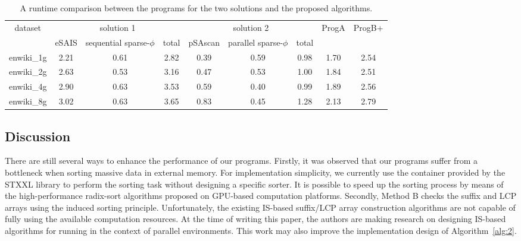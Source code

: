 \documentclass[10pt,journal,compsoc]{IEEEtran}
\begin{document}
\renewcommand\arraystretch{1.3}
\begin{table}[h]
	\caption{A runtime comparison between the programs for the two solutions and the proposed algorithms.}
	\label{tbl:3}
	\centering
	\begin{tabular}{|c|c|c|c|c|c|c|c|c|}
		\hline
		\multirow{2}{*}{dataset} & \multicolumn{3}{|c|}{solution 1} & \multicolumn{3}{c|}{solution 2} & \multirow{2}{*}{ProgA} & \multirow{2}{*}{ProgB+} \\\cline{2-7}
		 & eSAIS & sequential sparse-$\phi$ & total & pSAscan & parallel sparse-$\phi$ & total & & \\\hline
		enwiki\_1g & 2.21 & 0.61 & 2.82 & 0.39 & 0.59 & 0.98 & 1.70 & 2.54 \\\hline
		enwiki\_2g & 2.63 & 0.53 & 3.16 & 0.47 & 0.53 & 1.00 & 1.84 & 2.51 \\\hline
		enwiki\_4g & 2.90 & 0.63 & 3.53 & 0.59 & 0.40 & 0.99 & 1.89 & 2.56 \\\hline
		enwiki\_8g & 3.02 & 0.63 & 3.65 & 0.83 & 0.45 & 1.28 & 2.13 & 2.79 \\\hline
	\end{tabular}
\end{table}



\subsection{Discussion}

There are still several ways to enhance the performance of our programs. Firstly, it was observed that our programs suffer from a bottleneck when sorting massive data in external memory. For implementation simplicity, we currently use the container provided by the STXXL library to perform the sorting task without designing a specific sorter. It is possible to speed up the sorting process by means of the high-performance radix-sort algorithms proposed on GPU-based computation platforms. Secondly, Method B checks the suffix and LCP arrays using the induced sorting principle. Unfortunately, the existing IS-based suffix/LCP array construction algorithms are not capable of fully using the available computation resources. At the time of writing this paper, the authors are making research on designing IS-based algorithms for running in the context of parallel environments. This work may also improve the implementation design of Algorithm~\ref{alg:2}. 
\end{document}
